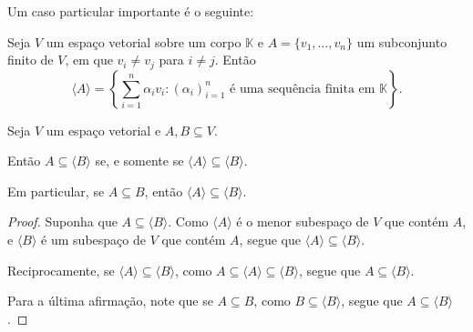 Um caso particular importante é o seguinte:

\begin{corollary}
    Seja $V$ um espaço vetorial sobre um corpo $\mathbb K$ e $A=\{v_1, \dots, v_n\}$ um subconjunto finito de $V$, em que $v_i\neq v_j$ para $i \neq j$.
    Então \begin{equation*}
        \langle A \rangle = \left\{\sum_{i=1}^n \alpha_i v_i : (\alpha_i)_{i=1}^n \text{ é uma sequência finita em } \mathbb K\right\}.
    \end{equation*}
\end{corollary}

\begin{proposition}
    Seja $V$ um espaço vetorial e $A, B\subseteq V$.

    Então $A\subseteq \langle B\rangle$ se, e somente se $\langle A\rangle \subseteq \langle B\rangle$.

    Em particular, se $A\subseteq B$, então $\langle A\rangle \subseteq \langle B\rangle$.
\end{proposition}
\begin{proof}
    Suponha que $A \subseteq \langle B\rangle$.
    Como $\langle A\rangle$ é o menor subespaço de $V$ que contém $A$, e $\langle B\rangle$ é um subespaço de $V$ que contém $A$, segue que $\langle A\rangle \subseteq \langle B\rangle$.

    Reciprocamente, se $\langle A\rangle \subseteq \langle B\rangle$, como $A \subseteq \langle A\rangle \subseteq \langle B\rangle$, segue que $A \subseteq \langle B\rangle$.

    Para a última afirmação, note que se $A \subseteq B$, como $B\subseteq \langle B\rangle$, segue que $A \subseteq \langle B\rangle$.
\end{proof}